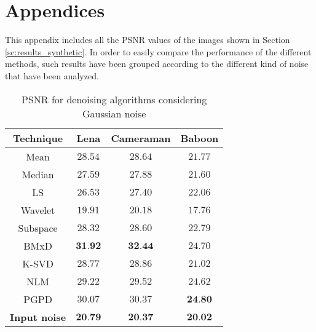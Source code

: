 \section{Appendices}
This appendix includes all the PSNR values of the images shown in Section \ref{sc:results_synthetic}. In order to easily compare the performance of the different methods, such results have been grouped according to the different kind of noise that have been analyzed.

\begin{table}[H]
	\centering
	\caption{PSNR for denoising algorithms considering Gaussian noise}
	\begin{tabular}{|c|c|c|c|}
	\hline
	\textbf{Technique} & \textbf{Lena} & \textbf{Cameraman} & \textbf{Baboon} \\ \hline
	Mean & $28.54$ & $28.64$ & $21.77$ \\ \hline
	Median & $27.59$ & $27.88$ & $21.60$ \\ \hline
	LS & $26.53$ & $27.40$ & $22.06$ \\ \hline
	Wavelet & $19.91$ & $20.18$& $17.76$\\ \hline
	Subspace & $28.32$ & $28.60$ & $22.79$ \\ \hline
	BMxD & $\textbf{31.92}$ & $\textbf{32.44}$ & $24.70$\\ \hline
	K-SVD & $28.77$ & $28.86$ & $21.02$ \\ \hline
	NLM & $29.22$ & $29.52$ & $24.62$ \\ \hline
	PGPD &$30.07$ & $30.37$ & $\textbf{24.80}$ \\ \hline
	\textbf{Input noise} & $\textbf{20.79}$ & $\textbf{20.37}$ & $\textbf{20.02}$ \\ \hline
	\end{tabular}
	\label{tab:numerical_results_gaussian}
\end{table}

